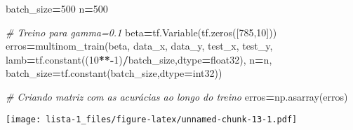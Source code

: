 \documentclass[
]{article}
\newenvironment{Shaded}{\begin{snugshade}}{\end{snugshade}}
\newcommand{\AttributeTok}[1]{\textcolor[rgb]{0.77,0.63,0.00}{#1}}
\newcommand{\CommentTok}[1]{\textcolor[rgb]{0.56,0.35,0.01}{\textit{#1}}}
\newcommand{\DecValTok}[1]{\textcolor[rgb]{0.00,0.00,0.81}{#1}}
\newcommand{\DocumentationTok}[1]{\textcolor[rgb]{0.56,0.35,0.01}{\textbf{\textit{#1}}}}
\newcommand{\FunctionTok}[1]{\textcolor[rgb]{0.00,0.00,0.00}{#1}}
\newcommand{\NormalTok}[1]{#1}
\newcommand{\OperatorTok}[1]{\textcolor[rgb]{0.81,0.36,0.00}{\textbf{#1}}}
\newcommand{\SpecialCharTok}[1]{\textcolor[rgb]{0.00,0.00,0.00}{#1}}
\newcommand{\StringTok}[1]{\textcolor[rgb]{0.31,0.60,0.02}{#1}}
\begin{document}
\begin{Shaded}
\begin{Highlighting}[]
\NormalTok{batch\_size}\OperatorTok{=}\DecValTok{500}
\NormalTok{n}\OperatorTok{=}\DecValTok{500}

\CommentTok{\# Treino para gamma=0.1}
\NormalTok{beta}\OperatorTok{=}\NormalTok{tf.Variable(tf.zeros([}\DecValTok{785}\NormalTok{,}\DecValTok{10}\NormalTok{]))}
\NormalTok{erros}\OperatorTok{=}\NormalTok{multinom\_train(beta,}
\NormalTok{                     data\_x,}
\NormalTok{                     data\_y,}
\NormalTok{                     test\_x,}
\NormalTok{                     test\_y,}
\NormalTok{                     lamb}\OperatorTok{=}\NormalTok{tf.constant((}\DecValTok{10}\OperatorTok{**{-}}\DecValTok{1}\NormalTok{)}\OperatorTok{/}\NormalTok{batch\_size,dtype}\OperatorTok{=}\StringTok{\textquotesingle{}float32\textquotesingle{}}\NormalTok{),}
\NormalTok{                     n}\OperatorTok{=}\NormalTok{n,}
\NormalTok{                     batch\_size}\OperatorTok{=}\NormalTok{tf.constant(batch\_size,dtype}\OperatorTok{=}\StringTok{\textquotesingle{}int32\textquotesingle{}}\NormalTok{))}

\CommentTok{\# Criando matriz com as acurácias ao longo do treino}
\NormalTok{erros}\OperatorTok{=}\NormalTok{np.asarray(erros)}
\end{Highlighting}
\end{Shaded}

\begin{Shaded}
\end{Shaded}

\texttt{[image: lista-1\_files/figure-latex/unnamed-chunk-13-1.pdf]}
\end{document}
